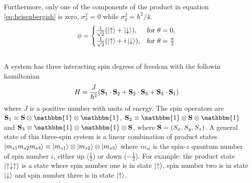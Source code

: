 \documentclass{article}
\begin{document}
Furthermore, only one of the components of the product in equation \ref{eq:heisenbergish} is zero, $\sigma_x^2=0$ while $\sigma_y^2=\hbar^2/4$.
\begin{equation}
\phi=
\begin{cases}
\frac{1}{\sqrt{2}}(\ket{\uparrow} + \ket{\downarrow}), &\text{for } \theta = 0, \\
\frac{1}{\sqrt{2}}(\ket{\uparrow} + i\ket{\downarrow}), &\text{for } \theta = \frac{\pi}{2}
\end{cases}
\end{equation}


\subsection{}
A system has three interacting spin degrees of freedom with the followin hamiltonian
\begin{equation}
H = \frac{J}{\hbar^2}(\vb{S}_1\cdot\vb{S}_2 + \vb{S}_2\cdot\vb{S}_3 + \vb{S}_3\cdot\vb{S}_1)
\end{equation}
where $J$ is a positive number with units of energy. The spin operators are $\vb{S}_1\equiv \vb{S}\otimes\mathbbm{1}\otimes\mathbbm{1}$, $\vb{S}_2\equiv \mathbbm{1}\otimes\vb{S}\otimes\mathbbm{1}$ and $\vb{S}_3\equiv \mathbbm{1}\otimes\mathbbm{1}\otimes\vb{S}$, where $\vb{S}=(S_x,S_y,S_z)$. A general state of this three-spin system is a linear combination of product states $\ket{m_{s1}m_{s2}m_{s3}}\equiv\ket{m_{s1}}\otimes\ket{m_{s2}}\otimes\ket{m_{s3}}$ where $m_{si}$ is the spin-$z$ quantum number of spin number $i$, either up ($\frac{1}{2}$) or down ($-\frac{1}{2}$). For example: the product state $\ket{\uparrow\downarrow\uparrow}$ is a state where spin number one is in state $\ket{\uparrow}$, spin number two is in state $\ket{\downarrow}$ and spin number three is in state $\ket{\uparrow}$.
\end{document}
